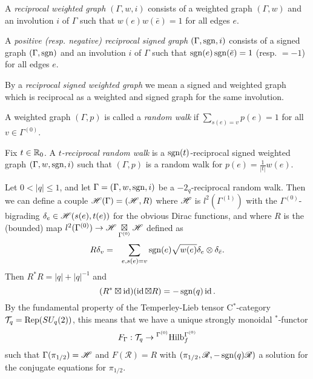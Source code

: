 
\begin{Def} A \emph{reciprocal weighted graph} $(\Gamma,w,i)$ consists of a weighted graph $(\Gamma,w)$ and an involution $i$ of $\Gamma$ such that $w(e)w(\bar{e}) = 1$ for all edges $e$. 

A \emph{positive (resp. negative) reciprocal signed graph} $(\Gamma,\operatorname{\mathrm{sgn}},i)$ consists of a signed graph $(\Gamma,\operatorname{\mathrm{sgn}})$ and an involution $i$ of $\Gamma$ such that $\operatorname{\mathrm{sgn}}(e)\operatorname{\mathrm{sgn}}(\bar{e}) = 1$ (resp. $=-1$) for all edges $e$. 

By a \emph{reciprocal signed weighted graph} we mean a signed and weighted graph which is reciprocal as a weighted and signed graph for the same involution. 

A weighted graph $(\Gamma,p)$ is called a \emph{random walk} if $\sum_{s(e)=v} p(e) = 1$ for all $v\in \Gamma^{(0)}$.
\end{Def}

\begin{Def} Fix $t\in \mathbb{R}_0$. A \emph{$t$-reciprocal random walk} is a $\operatorname{\mathrm{sgn}}(t)$-reciprocal signed weighted graph $(\Gamma,w,\operatorname{\mathrm{sgn}},i)$ such that $(\Gamma,p)$ is a random walk for $p(e) = \frac{1}{|t|}w(e)$.  
\end{Def}



Let $0<|q|\leq 1$, and let $\Gamma = (\Gamma,w,\operatorname{\mathrm{sgn}},i)$ be a $-2_q$-reciprocal random walk. Then we can define a couple $\mathscr{H}(\Gamma) = (\mathscr{H},R)$ where $\mathscr{H}$ is $l^2(\Gamma^{(1)})$ with the $\Gamma^{(0)}$-bigrading $\delta_e \in \mathscr{H}(s(e),t(e))$ for the obvious Dirac functions, and where $R$ is the (bounded) map $l^2(\Gamma^{(0)})\rightarrow \mathscr{H}\underset{\Gamma^{(0)}}{\boxtimes} \mathscr{H}$ defined as \begin{eqnarray*} R\delta_v &=& \sum_{e,s(e) = v} \operatorname{\mathrm{sgn}}(e)\sqrt{w(e)}\delta_e \otimes \delta_{\bar{e}}.\end{eqnarray*} Then $R^*R = |q|+|q|^{-1}$ and \[(R^*\boxtimes \operatorname{id})(\operatorname{id}\boxtimes R) = -\operatorname{\mathrm{sgn}}(q)\operatorname{id}.\] By the fundamental property of the Temperley-Lieb tensor C$^*$-category $\mathcal{T}_q = \mathrm{Rep}(SU_q(2))$, this means that we have a unique strongly monoidal $^*$-functor
\[F_{\Gamma}:\mathcal{T}_q \rightarrow {}^{\Gamma^{(0)}}\mathrm{Hilb}_f^{\Gamma^{(0)}}\] such that $\Gamma(\pi_{1/2}) = \mathscr{H}$ and $F(\mathscr{R}) = R$ with $(\pi_{1/2},\mathscr{R},-\operatorname{\mathrm{sgn}}(q)\mathscr{R})$ a solution for the conjugate equations for $\pi_{1/2}$. 

